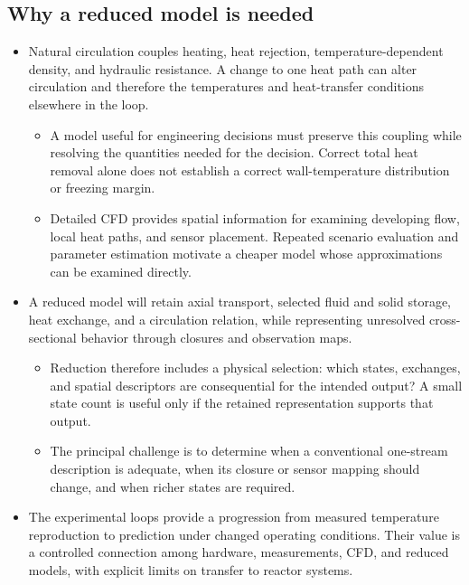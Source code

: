 \subsection{Why a reduced model is needed}\label{subsec:why-a-reduced-model-is-needed}
\begin{itemize}[leftmargin=*]
\item Natural circulation couples heating, heat rejection, temperature-dependent density, and hydraulic resistance. A change to one heat path can alter circulation and therefore the temperatures and heat-transfer conditions elsewhere in the loop.
\begin{itemize}
\item A model useful for engineering decisions must preserve this coupling while resolving the quantities needed for the decision. Correct total heat removal alone does not establish a correct wall-temperature distribution or freezing margin.
\item Detailed CFD provides spatial information for examining developing flow, local heat paths, and sensor placement. Repeated scenario evaluation and parameter estimation motivate a cheaper model whose approximations can be examined directly.
\end{itemize}
\item A reduced model will retain axial transport, selected fluid and solid storage, heat exchange, and a circulation relation, while representing unresolved cross-sectional behavior through closures and observation maps.
\begin{itemize}
\item Reduction therefore includes a physical selection: which states, exchanges, and spatial descriptors are consequential for the intended output? A small state count is useful only if the retained representation supports that output.
\item The principal challenge is to determine when a conventional one-stream description is adequate, when its closure or sensor mapping should change, and when richer states are required.\cite{fierro2026cfdoneD,reis2024molten}
\end{itemize}
\item The experimental loops provide a progression from measured temperature reproduction to prediction under changed operating conditions. Their value is a controlled connection among hardware, measurements, CFD, and reduced models, with explicit limits on transfer to reactor systems.\cite{brown2020msrphenomena}
\end{itemize}

